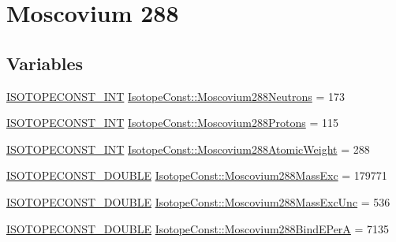 \hypertarget{group___isotope_const-_moscovium-_mc288}{}\section{Moscovium 288}
\label{group___isotope_const-_moscovium-_mc288}
\subsection*{Variables}
\begin{DoxyCompactItemize}
\item 
\mbox{\hyperlink{group___isotope_const-_macros_ga5f18360b3e99483a35c32d789e62621c}{I\+S\+O\+T\+O\+P\+E\+C\+O\+N\+S\+T\+\_\+\+I\+NT}} \mbox{\hyperlink{group___isotope_const-_moscovium-_mc288_gacdd5b2ca3025355dad019952f6a9e666}{Isotope\+Const\+::\+Moscovium288\+Neutrons}} = 173
\item 
\mbox{\hyperlink{group___isotope_const-_macros_ga5f18360b3e99483a35c32d789e62621c}{I\+S\+O\+T\+O\+P\+E\+C\+O\+N\+S\+T\+\_\+\+I\+NT}} \mbox{\hyperlink{group___isotope_const-_moscovium-_mc288_gaa31161fedc034ee6253697f239ef4078}{Isotope\+Const\+::\+Moscovium288\+Protons}} = 115
\item 
\mbox{\hyperlink{group___isotope_const-_macros_ga5f18360b3e99483a35c32d789e62621c}{I\+S\+O\+T\+O\+P\+E\+C\+O\+N\+S\+T\+\_\+\+I\+NT}} \mbox{\hyperlink{group___isotope_const-_moscovium-_mc288_ga2221e914feffda9a07a0ad1cb7174e92}{Isotope\+Const\+::\+Moscovium288\+Atomic\+Weight}} = 288
\item 
\mbox{\hyperlink{group___isotope_const-_macros_ga8f45a7272ce02c0b4c65c44636ed719a}{I\+S\+O\+T\+O\+P\+E\+C\+O\+N\+S\+T\+\_\+\+D\+O\+U\+B\+LE}} \mbox{\hyperlink{group___isotope_const-_moscovium-_mc288_ga1abf3f1761fec54f884dcca4505b56b6}{Isotope\+Const\+::\+Moscovium288\+Mass\+Exc}} = 179771
\item 
\mbox{\hyperlink{group___isotope_const-_macros_ga8f45a7272ce02c0b4c65c44636ed719a}{I\+S\+O\+T\+O\+P\+E\+C\+O\+N\+S\+T\+\_\+\+D\+O\+U\+B\+LE}} \mbox{\hyperlink{group___isotope_const-_moscovium-_mc288_gadc300d3a1daad8758187973513b24141}{Isotope\+Const\+::\+Moscovium288\+Mass\+Exc\+Unc}} = 536
\item 
\mbox{\hyperlink{group___isotope_const-_macros_ga8f45a7272ce02c0b4c65c44636ed719a}{I\+S\+O\+T\+O\+P\+E\+C\+O\+N\+S\+T\+\_\+\+D\+O\+U\+B\+LE}} \mbox{\hyperlink{group___isotope_const-_moscovium-_mc288_ga38e9abb2bc20fec9958465e18d55c952}{Isotope\+Const\+::\+Moscovium288\+Bind\+E\+PerA}} = 7135
\item 

\end{DoxyCompactItemize}
